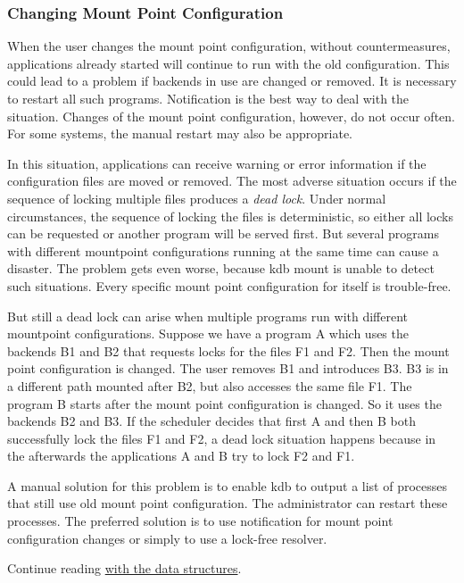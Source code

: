 \subsubsection*{Changing Mount Point Configuration}

When the user changes the mount point configuration, without countermeasures, applications already started will continue to run with the old configuration. This could lead to a problem if backends in use are changed or removed. It is necessary to restart all such programs. Notification is the best way to deal with the situation. Changes of the mount point configuration, however, do not occur often. For some systems, the manual restart may also be appropriate.

In this situation, applications can receive warning or error information if the configuration files are moved or removed. The most adverse situation occurs if the sequence of locking multiple files produces a {\itshape dead lock}. Under normal circumstances, the sequence of locking the files is deterministic, so either all locks can be requested or another program will be served first. But several programs with different mountpoint configurations running at the same time can cause a disaster. The problem gets even worse, because {\ttfamily kdb mount} is unable to detect such situations. Every specific mount point configuration for itself is trouble-\/free.

But still a dead lock can arise when multiple programs run with different mountpoint configurations. Suppose we have a program {\ttfamily A} which uses the backends {\ttfamily B1} and {\ttfamily B2} that requests locks for the files {\ttfamily F1} and {\ttfamily F2}. Then the mount point configuration is changed. The user removes {\ttfamily B1} and introduces {\ttfamily B3}. {\ttfamily B3} is in a different path mounted after {\ttfamily B2}, but also accesses the same file {\ttfamily F1}. The program {\ttfamily B} starts after the mount point configuration is changed. So it uses the backends {\ttfamily B2} and {\ttfamily B3}. If the scheduler decides that first {\ttfamily A} and then {\ttfamily B} both successfully lock the files {\ttfamily F1} and {\ttfamily F2}, a dead lock situation happens because in the afterwards the applications {\ttfamily A} and {\ttfamily B} try to lock {\ttfamily F2} and {\ttfamily F1}.

A manual solution for this problem is to enable {\ttfamily kdb} to output a list of processes that still use old mount point configuration. The administrator can restart these processes. The preferred solution is to use notification for mount point configuration changes or simply to use a lock-\/free resolver.

Continue reading \hyperlink{doc_dev_data-structures_md}{with the data structures}. 